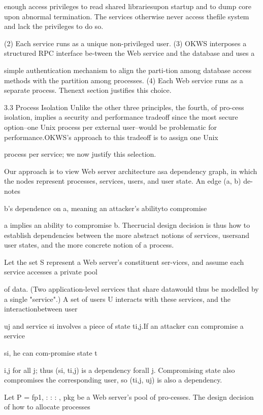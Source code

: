 enough access privileges to read shared librariesupon startup and to dump core upon abnormal termination. The services otherwise never access thefile system and lack the privileges to do so.

(2) Each service runs as a unique non-privileged user.
(3) OKWS interposes a structured RPC interface be-tween the Web service and the database and uses a

simple authentication mechanism to align the parti-tion among database access methods with the partition among processes.
(4) Each Web service runs as a separate process. Thenext section justifies this choice.

3.3 Process Isolation
Unlike the other three principles, the fourth, of pro-cess isolation, implies a security and performance tradeoff since the most secure option--one Unix process per
external user--would be problematic for performance.OKWS's approach to this tradeoff is to assign one Unix

process per service; we now justify this selection.

Our approach is to view Web server architecture asa dependency graph, in which the nodes represent processes, services, users, and user state. An edge (a, b) de-notes

b's dependence on a, meaning an attacker's abilityto compromise

a implies an ability to compromise b. Thecrucial design decision is thus how to establish dependencies between the more abstract notions of services, usersand user states, and the more concrete notion of a process.

Let the set S represent a Web server's constituent ser-vices, and assume each service accesses a private pool

of data. (Two application-level services that share datawould thus be modelled by a single "service".) A set of
users U interacts with these services, and the interactionbetween user

uj and service si involves a piece of state ti,j.If an attacker can compromise a service

si, he can com-promise state t

i,j for all j; thus (si, ti,j) is a dependency forall j. Compromising state also compromises the corresponding user, so (ti,j, uj) is also a dependency.

Let P = fp1, : : : , pkg be a Web server's pool of pro-cesses. The design decision of how to allocate processes

